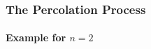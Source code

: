\documentclass{beamer}
\begin{document}
	\begin{frame}
	    \frametitle{The Percolation Process}
		\framesubtitle{Example for $n=2$}
		\begin{center}

\end{center}
\end{frame}
\end{document}
